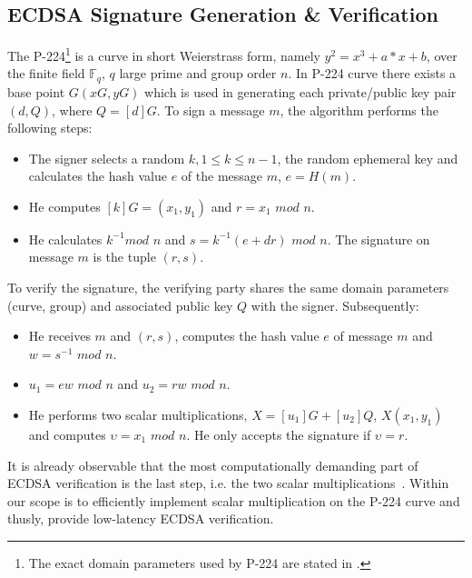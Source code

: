 \documentclass[11pt,twocolumn]{IEEEtran}
\begin{document}
\subsection{ECDSA Signature Generation \& Verification}\label{signature}
 The P-224\footnote{The exact domain parameters used by P-224 are stated in  \cite{certicom,dss}.} is a curve in short Weierstrass form, namely $y^2=x^3+a*x+b$, over the finite field $\mathbb{F}_q$, $q$ large prime and group order $n$. In P-224 curve there exists a base point $G(xG, yG)$ which is used in generating each private/public key pair $(d,Q)$, where $Q=[d]G$.  To sign a message $m$, the algorithm performs the following steps:
\begin{itemize}
\item The signer selects a random $k, 1\leq k\leq n-1$, the random ephemeral key and calculates the hash value $e$ of the message $m$, $e=H(m)$.
\item He computes $[k]G=(x_1, y_1)$ and $r=x_1$ $mod$ $n$.
\item He calculates $k^{-1}mod$ $n$ and $s = k^{-1}(e+dr)$ $mod$ $n$. The signature on message $m$ is the tuple $(r,s)$.
\end{itemize}
To verify the signature, the verifying party shares the same domain parameters (curve, group) and associated public key $Q$ with the signer. Subsequently:
\begin{itemize}
\item He receives $m$ and $(r,s)$, computes the hash value $e$ of message $m$ and $w=s^{-1}$ $mod$ $n$.
\item $u_1=ew$ $mod$ $n$ and $u_2=rw$ $mod$ $n$.
\item He performs two scalar multiplications, $X=[u_1]G+[u_2]Q$, $X(x_1,y_1)$ and computes $\upsilon=x_1$ $mod$ $n$. He only accepts the signature if $\upsilon=r$.
\end{itemize}
It is already observable that the most computationally demanding part of ECDSA verification is the last step, i.e. the two scalar multiplications~\cite{petit}. Within our scope is to efficiently implement scalar multiplication on the P-224 curve and thusly, provide low-latency ECDSA verification.  
\end{document}
